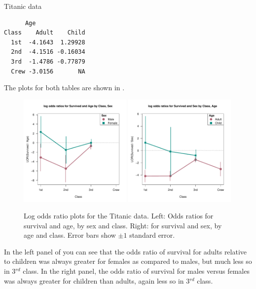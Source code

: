 \documentclass[10pt,krantz2]{krantz}\usepackage[]{graphicx}\usepackage[]{color}
\makeatletter
\newenvironment{kframe}{%
 \def\at@end@of@kframe{}%
 \ifinner\ifhmode%
  \def\at@end@of@kframe{\end{minipage}}%
  \begin{minipage}{\columnwidth}%
 \fi\fi%
 \def\FrameCommand##1{\hskip\@totalleftmargin \hskip-\fboxsep
 \colorbox{shadecolor}{##1}\hskip-\fboxsep
     \hskip-\linewidth \hskip-\@totalleftmargin \hskip\columnwidth}%
 \MakeFramed {\advance\hsize-\width
   \@totalleftmargin\z@ \linewidth\hsize
   \@setminipage}}%
 {\par\unskip\endMakeFramed%
 \at@end@of@kframe}
\newenvironment{knitrout}{}{} %
\renewenvironment{knitrout}{\small\renewcommand{\baselinestretch}{.85}}{} %
\makeatother
\begin{document}
\begin{Example}{Titanic data}
\begin{knitrout}
\begin{kframe}
\begin{verbatim}
      Age
Class    Adult    Child
  1st  -4.1643  1.29928
  2nd  -4.1516 -0.16034
  3rd  -1.4786 -0.77879
  Crew -3.0156       NA
\end{verbatim}
\end{kframe}
\end{knitrout}
The plots for both tables are shown in .
\begin{knitrout}
\color{fgcolor}\begin{figure}[!htbp]

\centerline{\includegraphics[width=0.49\textwidth]{ch05/fig/titanic-lor-plot-1} 
\includegraphics[width=0.49\textwidth]{ch05/fig/titanic-lor-plot-2} }

\caption[Log odds ratio plots for the Titanic data.]{Log odds ratio plots for the Titanic data. Left: Odds ratios for survival and age, by sex and class. Right: for survival and sex, by age and class. Error bars show $\pm 1$ standard error.}\label{fig:titanic-lor-plot}
\end{figure}


\end{knitrout}
In the left panel of  you can see that the odds ratio of
survival for adults relative to children was always greater for females as compared
to males, but much less so in 3$^{rd}$ class.
In the right panel, the odds ratio of survival for males versus females was always
greater for children than adults, again less so in 3$^{rd}$ class.
\end{Example}
\end{document}
